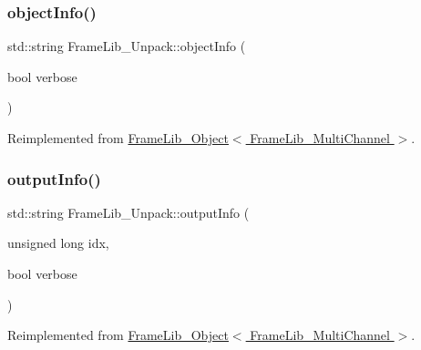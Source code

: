 \mbox{\label{class_frame_lib___unpack_ab298a6feb7c051f3563a01caacd99c02}} 
\subsubsection{\texorpdfstring{object\+Info()}{objectInfo()}}
{\footnotesize\ttfamily std\+::string Frame\+Lib\+\_\+\+Unpack\+::object\+Info (\begin{DoxyParamCaption}\item[{bool}]{verbose }\end{DoxyParamCaption})\hspace{0.3cm}{\ttfamily [virtual]}}



Reimplemented from \hyperlink{class_frame_lib___object_a10d673de9a3c59ace6a22ba1cff313c8}{Frame\+Lib\+\_\+\+Object$<$ Frame\+Lib\+\_\+\+Multi\+Channel $>$}.

\mbox{\label{class_frame_lib___unpack_a7e9a710850c3d94d73d00ea27a90d494}} 
\subsubsection{\texorpdfstring{output\+Info()}{outputInfo()}}
{\footnotesize\ttfamily std\+::string Frame\+Lib\+\_\+\+Unpack\+::output\+Info (\begin{DoxyParamCaption}\item[{unsigned long}]{idx,  }\item[{bool}]{verbose }\end{DoxyParamCaption})\hspace{0.3cm}{\ttfamily [virtual]}}



Reimplemented from \hyperlink{class_frame_lib___object_a6e6d79e8d620eedbaa50abf324cdedf5}{Frame\+Lib\+\_\+\+Object$<$ Frame\+Lib\+\_\+\+Multi\+Channel $>$}.

\mbox{\label{class_frame_lib___unpack_a7a88aeaeeaa657858c014a685ef901e7}} 
